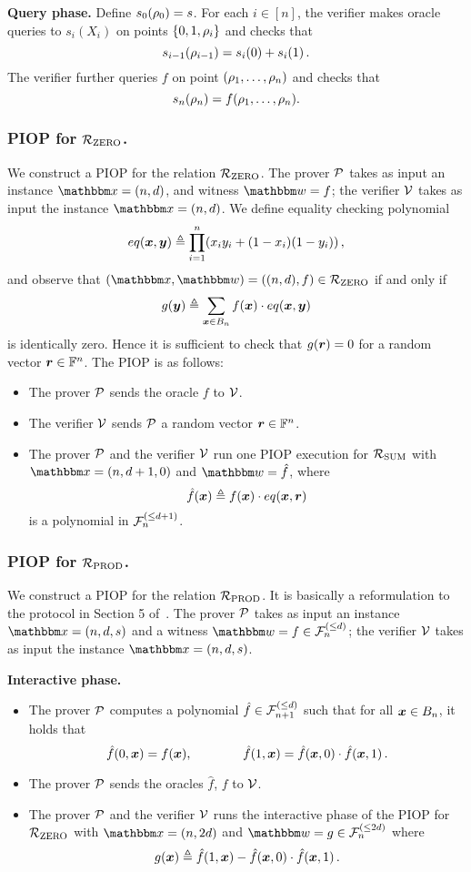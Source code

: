 \textbf{Query phase.}
Define $s_0(\rho_{0}) = s$. For each $i \in [n]$, the verifier makes oracle queries to $s_i(X_i)$ on points
$\{0, 1, \rho_{i} \}$ and checks that
\[
  s_{i-1}(\rho_{i-1}) = s_{i}(0) + s_{i}(1) \,.  
\]
The verifier further queries $f$ on point $(\rho_{1}, \dots, \rho_{n})$ and checks that
\[
  s_n(\rho_{n}) = f(\rho_{1}, \dots, \rho_{n}).  
\]

\subsubsection*{PIOP for ${\mathcal{R}}_{\text{ZERO}}$.} 
We construct a PIOP for the relation ${\mathcal{R}}_{\text{ZERO}}$.
The prover $\mathcal{P}$ takes as input an instance $\instR = (n, d)$,
and witness $\witR = f$; the verifier $\mathcal{V}$ takes as input the 
instance $\instR = (n, d)$. We define equality checking polynomial
\[
  eq(\boldsymbol{x}, \boldsymbol{y}) \mathrel{\triangleq} \prod_{i=1}^{n} (x_iy_i + (1-x_i)(1-y_i)) \,,
\]
and observe that $(\instR, \witR) = ((n,d), f) \in \RZERO$ if and only if
\[
  g(\boldsymbol{y}) \mathrel{\triangleq} \sum_{\boldsymbol{x} \in B_{n}} f(\boldsymbol{x}) \cdot eq(\boldsymbol{x}, \boldsymbol{y})  
\]
is identically zero. Hence it is sufficient to check that $g(\boldsymbol{r}) = 0$
for a random vector $\boldsymbol{r} \in \mathbb{F}^n$. The PIOP is as follows:
\begin{itemize}
    \item The prover $\mathcal{P}$ sends the oracle $f$ to $\mathcal{V}$.
    \item The verifier $\mathcal{V}$ sends $\mathcal{P}$ a random vector $\boldsymbol{r} \in \mathbb{F}^{n}$.
    \item The prover $\mathcal{P}$ and the verifier $\mathcal{V}$ run one PIOP execution
    for ${\mathcal{R}}_{\text{SUM}}$ with $\instR = (n, d+1, 0)$ and $\witR = \hat{f}$, where
    \[
      \hat{f}(\boldsymbol{x}) \mathrel{\triangleq} f(\boldsymbol{x}) \cdot eq(\boldsymbol{x}, \boldsymbol{r}) 
    \]
    is a polynomial in ${\mathcal{F}}_{n}^{(\le{d+1})}$.
\end{itemize}

\subsubsection*{PIOP for ${\mathcal{R}}_{\text{PROD}}$.}
We construct a PIOP for the relation ${\mathcal{R}}_{\text{PROD}}$.
It is basically a reformulation to the protocol in Section 5
of~\cite{SL20}.
The prover $\mathcal{P}$ takes as input an instance $\instR = (n, d, s)$
and a witness $\witR = f \in \bdp{n}{d}$; the verifier $\mathcal{V}$
takes as input the instance $\instR = (n, d, s)$.

\textbf{Interactive phase.} 
\begin{itemize}
    \item The prover $\mathcal{P}$ computes a polynomial $\hat{f} \in {\mathcal{F}}_{n+1}^{(\le{d})}$ such that 
    for all $\boldsymbol{x} \in B_{n}$, it holds that
    \[
      \hat{f}(0, \boldsymbol{x}) = f(\boldsymbol{x}), \qquad \qquad \hat{f}(1, \boldsymbol{x}) = \hat{f}(\boldsymbol{x}, 0) \cdot \hat{f}(\boldsymbol{x}, 1)\,.
    \]
    \item The prover $\mathcal{P}$ sends the oracles $\hat{f}$, $f$ to $\mathcal{V}$.
    \item The prover $\mathcal{P}$ and the verifier $\mathcal{V}$ runs the interactive phase of 
        the PIOP for ${\mathcal{R}}_{\text{ZERO}}$ with $\instR = (n, 2d)$ and $\witR = g \in \bdp{n}{2d}$ where
        \[
            g(\boldsymbol{x}) \mathrel{\triangleq} \hat{f}(1, \boldsymbol{x}) - \hat{f}(\boldsymbol{x}, 0) \cdot \hat{f}(\boldsymbol{x}, 1) \,.
        \]
\end{itemize}

